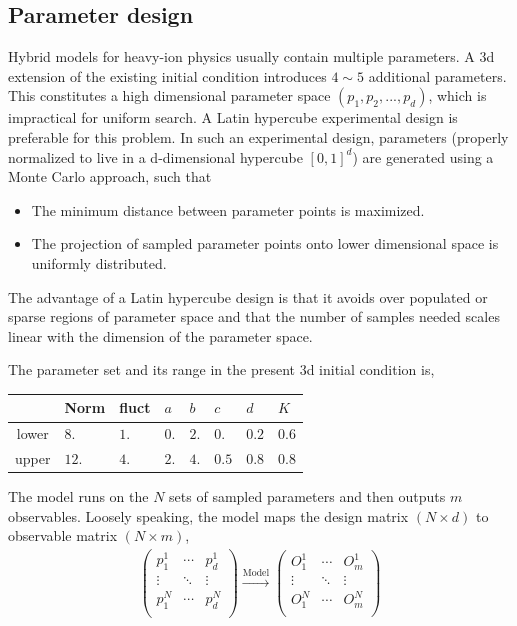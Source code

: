 \documentclass[aps,prl,twocolumn,groupedaddress]{revtex4-1}
\begin{document}
	\subsection{Parameter design} 
	Hybrid models for heavy-ion physics usually contain multiple parameters. 
	A 3d extension of the existing initial condition introduces $4\sim5$ additional parameters.
	This constitutes a high dimensional parameter space $(p_1, p_2, ..., p_d)$, which is impractical for uniform search. 
	A Latin hypercube experimental design is preferable for this problem. 
	In such an experimental design, parameters (properly normalized to live in a d-dimensional hypercube $[0,1]^d$) are generated using a Monte Carlo approach, such that
	\begin{itemize}
		\item The minimum distance between parameter points is maximized.
		\item The projection of sampled parameter points onto lower dimensional space is uniformly distributed.
	\end{itemize}
	The advantage of a Latin hypercube design is that it avoids over populated or sparse regions of parameter space and that the number of samples needed scales linear with the dimension of the parameter space.
	
	The parameter set and its range in the present 3d initial condition is,
	\begin{center}
	\begin{tabularx}{0.45\textwidth}{c*{7}{Y}}
		\toprule[1pt]
		 & Norm	& fluct	& $a$ & $b$ & $c$ & $d$ & $K$ \\
		\midrule[0.5pt]
		lower & $8.$		&  $1.$	&	$0.$&	 $2.$ & $0.$ & $0.2$ & $0.6$ \\
		upper	& $12.$		&  $4.$	&	$2.$& $4.$ & $0.5$ & $0.8$ & $0.8$ \\
		\bottomrule[1pt]
	\end{tabularx}\label{parameter}
	\end{center}
	The model runs on the $N$ sets of sampled parameters and then outputs $m$ observables. Loosely speaking, the model maps the design matrix $(N \times d)$ to observable matrix $(N \times m)$,
	\begin{eqnarray}\label{design-obs}
	\left(\begin{array}{ccc}
	p_{1}^{1}  & \cdots & p_{d}^{1}\\
	\vdots  & \ddots & \vdots\\
	p_{1}^{N}  & \cdots & p_{d}^{N}\\
	\end{array}\right)
	\xrightarrow{\textrm{Model}} 
	\left(\begin{array}{ccc}
	O_{1}^{1}  & \cdots & O_{m}^{1}\\
	\vdots  & \ddots & \vdots\\
	O_{1}^{N}  & \cdots & O_{m}^{N}\\
	\end{array}\right)
	\end{eqnarray}
	
\end{document}
